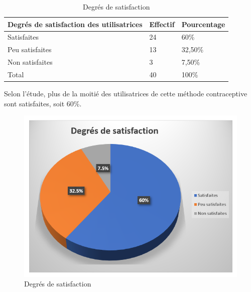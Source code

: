 \begin{table}[H]
  \centering
  \renewcommand{\arraystretch}{1.5}
  \caption{Degrés de satisfaction}
  \begin{spacing}{1.5} %
  \begin{tabularx}{\textwidth}{|p{8cm}|X|X|}
      \hline
      \rowcolor{customcolor}
      \textbf{\color{white}Degrés de satisfaction des utilisatrices} & \textbf{\color{white}Effectif} & \textbf{\color{white}Pourcentage}  \\
      \hline
      Satisfaites & 24 & 60\% \\
      \hline
      Peu satisfaites  & 13 & 32,50\% \\
      \hline
      Non satisfaites & 3 & 7,50\% \\
      \hline
      Total & 40 & 100\% \\
      
      \hline
  \end{tabularx}
\end{spacing}

\end{table}


\noindent Selon l’étude, plus de la moitié des utilisatrices de cette méthode contraceptive sont satisfaites, soit 60\%. 

\begin{figure}[H]
  \centering
  \includegraphics[scale=1.1]{Images/fig_58.png}
  \caption{Degrés de satisfaction}
  
\end{figure}


